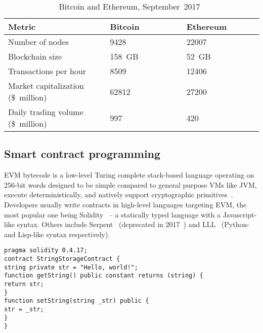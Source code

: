 \begin{table}[ht]
	\centering
	\begin{tabular}{|p{0.40\linewidth}|p{0.30\linewidth}|p{0.30\linewidth}|}
		\hline
		\textbf{Metric} & \textbf{Bitcoin} & \textbf{Ethereum} \\
		\hline\hline
		Number of nodes & 9428 & 22007 \\
		\hline
		Blockchain size & 158~GB & 52~GB \\
		\hline
		Transactions per hour & 8509 & 12406 \\ 
		\hline
		Market capitalization (\$~million) & 62812 & 27200 \\
		\hline
		Daily trading volume (\$~million) & 997 & 420 \\
		\hline
	\end{tabular}
	\caption{Bitcoin and Ethereum, September~2017~\cite{Etherchain17, Bitnodes17, Ethernodes17, Bitinfocharts17, Coinmarketcap17}}
	\label{table:1}
\end{table}

\subsection{Smart contract programming}

EVM bytecode is a low-level Turing complete stack-based language operating on 256-bit words designed to be simple compared to general purpose VMs like JVM, execute deterministically, and natively support cryptographic primitives~\cite{Buterin2017}.
Developers usually write contracts in high-level languages targeting EVM, the most popular one being Solidity~\cite{Solidity17} -- a statically typed language with a Javascript-like syntax.
Others include Serpent~\cite{SerpentGithub} (deprecated in 2017~\cite{Castor2017}) and LLL~\cite{Ellison2017} (Python- and Lisp-like syntax respectively).

\begin{lstlisting}[language=Solidity, caption=A simple contract in Solidity]
pragma solidity 0.4.17;
contract StringStorageContract {
string private str = "Hello, world!";
function getString() public constant returns (string) {
return str;
}
function setString(string _str) public {
str = _str;
}
}
\end{lstlisting}

